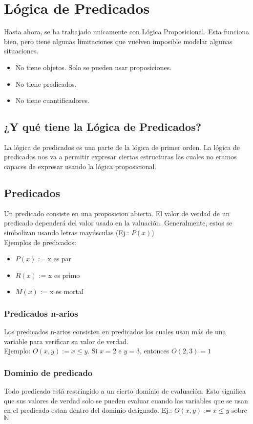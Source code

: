 \documentclass[../main.tex]{subfiles}
\begin{document}
\section{Lógica de Predicados}
Hasta ahora, se ha trabajado unicamente con Lógica Proposicional. Esta funciona bien, pero tiene algunas limitaciones que vuelven imposible modelar algunas situaciones.
\begin{itemize}
    \item No tiene objetos. Solo se pueden usar proposiciones.
    \item No tiene predicados.
    \item No tiene cuantificadores.
\end{itemize}

\subsection{¿Y qué tiene la Lógica de Predicados?}
La lógica de predicados es una parte de la lógica de primer orden. La lógica de predicados nos va a permitir expresar ciertas estructuras las cuales no eramos capaces de expresar usando la lógica proposicional.

\subsection{Predicados}
Un predicado consiste en una proposicion abierta. El valor de verdad de un predicado dependerá del valor usado en la valuación. Generalmente, estos se simbolizan usando letras mayúsculas (Ej.: $P(x)$)\\
Ejemplos de predicados:
\begin{itemize}
    \item $P(x)$ := x es par
    \item $R(x)$ := x es primo
    \item $M(x)$ := x es mortal
\end{itemize}

\subsubsection{Predicados n-arios}
Los predicados n-arios consisten en predicados los cuales usan más de una variable para verificar su valor de verdad.\\
Ejemplo: $O(x,y) := x \leq y $. Si $x = 2$ e $y = 3$, entonces $O(2,3) = 1$

\subsubsection{Dominio de predicado}
Todo predicado está restringido a un cierto dominio de evaluación. Esto significa que sus valores de verdad solo se pueden evaluar cuando las variables que se usan en el predicado estan dentro del dominio designado.
Ej.: $O(x,y) := x \leq{} y$ sobre $\mathds{N}$
\end{document}
